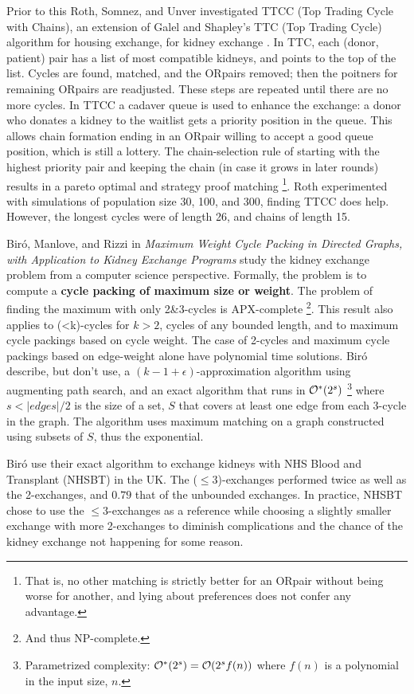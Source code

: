 \documentclass[main.tex]{subfiles}
\begin{document}
Prior to this Roth, Somnez, and Unver investigated TTCC (Top Trading Cycle with Chains), an extension of Galel and Shapley's TTC (Top Trading Cycle) algorithm for housing exchange, for kidney exchange \cite{Rot1}. In TTC, each (donor, patient) pair has a list of most compatible kidneys, and points to the top of the list. Cycles are found, matched, and the ORpairs removed; then the poitners for remaining ORpairs are readjusted. These steps are repeated until there are no more cycles. In TTCC a cadaver queue is used to enhance the exchange: a donor who donates a kidney to the waitlist gets a priority position in the queue. This allows chain formation ending in an ORpair willing to accept a good queue position, which is still a lottery. The chain-selection rule of starting with the highest priority pair and keeping the chain (in case it grows in later rounds) results in a pareto optimal and strategy proof matching \footnote{That is, no other matching is strictly better for an ORpair without being worse for another, and lying about preferences does not confer any advantage.}. Roth experimented with simulations of population size 30, 100, and 300, finding TTCC does help. However, the longest cycles were of length 26, and chains of length 15.

Bir\'{o}, Manlove, and Rizzi in \textit{Maximum Weight Cycle Packing in Directed Graphs,
with Application to Kidney Exchange Programs} \cite{Bir} study the kidney exchange problem from a computer science perspective. Formally, the problem is to compute a \textbf{cycle packing of maximum size or weight}. The problem of finding the maximum with only 2\&3-cycles is APX-complete \footnote{And thus NP-complete.}. This result also applies to (<k)-cycles for $k > 2$, cycles of any bounded length, and to maximum cycle packings based on cycle weight. The case of 2-cycles and maximum cycle packings based on edge-weight alone have polynomial time solutions. Bir\'{o} describe, but don't use, a $(k - 1 + \epsilon)$-approximation algorithm using augmenting path search, and an exact algorithm that runs in $\mathcal{O}^*(2^s)$ \footnote{Parametrized complexity: $\mathcal{O}^*(2^s) = \mathcal{O}(2^sf(n))$ where $f(n)$ is a polynomial in the input size, $n$.} where $s < |edges|/2$ is the size of a set, $S$ that covers at least one edge from each 3-cycle in the graph. The algorithm uses maximum matching on a graph constructed using subsets of $S$, thus the exponential.

Bir\'{o} use their exact algorithm to exchange kidneys with NHS Blood and Transplant (NHSBT) in the UK. The ($\leq 3$)-exchanges performed twice as well as the 2-exchanges, and $0.79$ that of the unbounded exchanges. In practice, NHSBT chose to use the $\leq 3$-exchanges as a reference while choosing a slightly smaller exchange with more 2-exchanges to diminish complications and the chance of the kidney exchange not happening for some reason.
\end{document}
